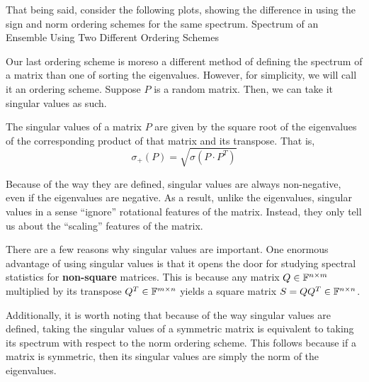 That being said, consider the following plots, showing the difference in using the sign and norm ordering schemes for the same spectrum.
\trim
{Spectrum of an Ensemble Using Two Different Ordering Schemes}

\newpage
{}

Our last ordering scheme is moreso a different method of defining the spectrum of a matrix than one of sorting the eigenvalues.
However, for simplicity, we will call it an ordering scheme.
Suppose $P$ is a random matrix.
Then, we can take it singular values as such.
\begin{definition}
The singular values of a matrix $P$ are given by the square root of the eigenvalues of the corresponding product of that matrix and its transpose.
That is, $$\sigma_+(P) = \sqrt{\sigma(P \cdot P^T)}$$
\end{definition}
Because of the way they are defined, singular values are always non-negative, even if the eigenvalues are negative.
As a result, unlike the eigenvalues, singular values in a sense ``ignore'' rotational features of the matrix. Instead, they only tell us about the ``scaling'' features of the matrix.

There are a few reasons why singular values are important.
One enormous advantage of using singular values is that it opens the door for studying spectral statistics for \textbf{non-square} matrices.
This is because any matrix $Q \in \mathbb{F}^{n \times m}$ multiplied by its transpose $Q^T \in \mathbb{F}^{m \times n}$ yields a square matrix $S = Q Q^T \in \mathbb{F}^{n \times n}$.

Additionally, it is worth noting that because of the way singular values are defined,
taking the singular values of a symmetric matrix is equivalent to taking its spectrum with respect to the norm ordering scheme.
This follows because if a matrix is symmetric, then its singular values are simply the norm of the eigenvalues.

\spectrumschemetable

